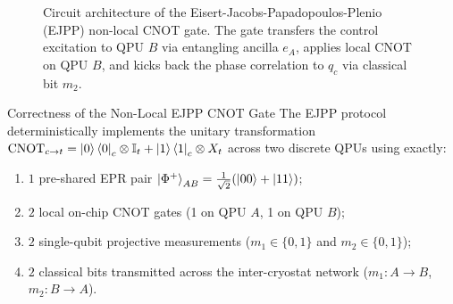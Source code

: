 \begin{figure}[htbp]
    \caption{Circuit architecture of the Eisert-Jacobs-Papadopoulos-Plenio (EJPP) non-local CNOT gate. The gate transfers the control excitation to QPU $B$ via entangling ancilla $e_A$, applies local CNOT on QPU $B$, and kicks back the phase correlation to $q_c$ via classical bit $m_2$.}
    \label{fig:ejpp_circuit_diagram}
\end{figure}

\begin{theorembox}{Correctness of the Non-Local EJPP CNOT Gate}
The EJPP protocol deterministically implements the unitary transformation $\text{CNOT}_{c \to t} = \ket{0}\bra{0}_c \otimes \mathbb{I}_t + \ket{1}\bra{1}_c \otimes X_t$ across two discrete QPUs using exactly:
\begin{enumerate}
    \item $1$ pre-shared EPR pair $\ket{\Phi^+}_{AB} = \frac{1}{\sqrt{2}}(\ket{00} + \ket{11})$;
    \item $2$ local on-chip CNOT gates (1 on QPU $A$, 1 on QPU $B$);
    \item $2$ single-qubit projective measurements ($m_1 \in \{0, 1\}$ and $m_2 \in \{0, 1\}$);
    \item $2$ classical bits transmitted across the inter-cryostat network ($m_1: A \to B$, $m_2: B \to A$).
\end{enumerate}
\end{theorembox}

